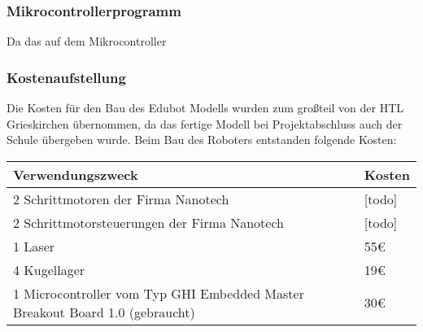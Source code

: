 \subsubsection{Mikrocontrollerprogramm}
Da das auf dem Mikrocontroller 
\subsubsection{Kostenaufstellung}
Die Kosten für den Bau des Edubot Modells wurden zum großteil von der HTL Grieskirchen übernommen, da das fertige Modell bei Projektabschluss auch der Schule übergeben wurde. Beim Bau des Roboters entstanden folgende Kosten:

\begin{tabular}{|p{11cm}|p{3cm}|}
\hline \rowcolor{lightgray}
\textbf{Verwendungszweck} & \textbf{Kosten}\\
\hline
2 Schrittmotoren der Firma Nanotech & [todo]\\
\hline
2 Schrittmotorsteuerungen der Firma Nanotech & [todo]\\
\hline
1 Laser & 55\euro{}\\
\hline
4 Kugellager & 19\euro{}\\
\hline
1 Microcontroller vom Typ GHI Embedded Master Breakout Board 1.0 (gebraucht) & 30\euro{}\\ 
\hline
\end{tabular}
